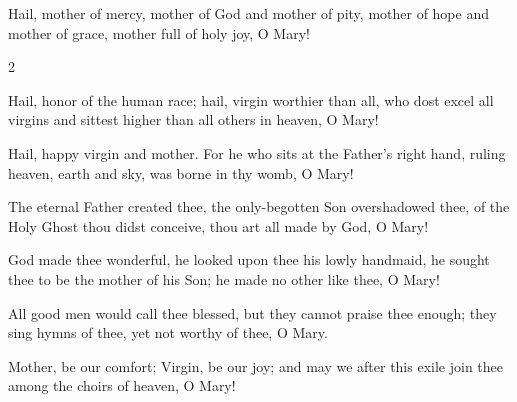 
\noindent \begin{enpars}Hail, mother of mercy, mother of God and mother of pity, mother of hope and
mother of grace, mother full of holy
joy, O Mary!\end{enpars}

\begin{multicols}{2}
\raggedcolumns
\begin{enpars}
Hail, honor of the human race;
hail, virgin worthier than all, who
dost excel all virgins and sittest
higher than all others in heaven, O Mary!

Hail, happy virgin and mother.
For he who sits at the Father's right
hand, ruling heaven, earth and sky,
was borne in thy womb, O Mary!

The eternal Father created thee,
the only-begotten Son overshadowed thee, of the Holy Ghost thou
didst conceive, thou art all made by God, O Mary!

God made thee wonderful, he
looked upon thee his lowly handmaid, he sought thee to be the mother
of his Son; he made no other like thee, O Mary!

All good men would call thee
blessed, but they cannot praise thee
enough; they sing hymns of thee,
yet not worthy of thee, O Mary.

Mother, be our comfort; Virgin,
be our joy; and may we after this
exile join thee among the choirs of
heaven, O Mary!
\end{enpars}\end{multicols}